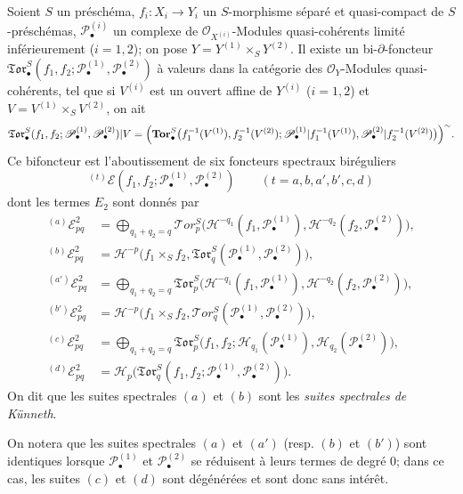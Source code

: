 \begin{theorem}[6.7.3]
Soient $S$ un préschéma, $f_i:X_i\to Y_i$ un $S$-morphisme séparé et
quasi-compact de $S$-préschémas, $\mathscr P_\bullet^{(i)}$ un complexe de
$\mathscr O_{X^{(i)}}$-Modules quasi-cohérents limité inférieurement
($i=1,2$); on pose $Y=Y^{(1)}\times_S Y^{(2)}$. Il existe un
bi-$\partial$-foncteur
  $\mathfrak{Tor}_\bullet^S
(f_1,f_2;\mathscr P_\bullet^{(1)},\mathscr P_\bullet^{(2)})$
à valeurs dans la catégorie des $\mathscr O_Y$-Modules quasi-cohérents, tel
que si $V^{(i)}$ est un ouvert affine de $Y^{(i)}$ ($i=1,2$) et
$V=V^{(1)}\times_S V^{(2)}$, on ait
\[
  \mathfrak{Tor}_\bullet^S
  (f_1,f_2;\mathscr P_\bullet^{(1)},\mathscr P_\bullet^{(2)})|V
  =\Bigl(\mathbf{Tor}_\bullet^S
    \bigl(f_1^{-1}(V^{(1)}),f_2^{-1}(V^{(2)});
      \mathscr P_\bullet^{(1)}|f_1^{-1}(V^{(1)}),
      \mathscr P_\bullet^{(2)}|f_2^{-1}(V^{(2)})\bigr)\Bigr)^{\sim}.
\]
Ce bifoncteur est l'aboutissement de six foncteurs spectraux biréguliers
\[
  {}^{(t)}\mathscr E
  (f_1,f_2;\mathscr P_\bullet^{(1)},\mathscr P_\bullet^{(2)})
  \qquad(t=a,b,a',b',c,d)
\]
dont les termes $E_2$ sont donnés par
\[
\begin{aligned}
  {}^{(a)}\mathscr E_{pq}^2
  &=\bigoplus_{q_1+q_2=q}
    \mathscr{T}\!or_p^S
    \bigl(\mathscr H^{-q_1}(f_1,\mathscr P_\bullet^{(1)}),
          \mathscr H^{-q_2}(f_2,\mathscr P_\bullet^{(2)})\bigr),\\
  {}^{(b)}\mathscr E_{pq}^2
  &=\mathscr H^{-p}\bigl(f_1\times_S f_2,
    \mathfrak{Tor}_q^S
    (\mathscr P_\bullet^{(1)},\mathscr P_\bullet^{(2)})\bigr),\\
  {}^{(a')}\mathscr E_{pq}^2
  &=\bigoplus_{q_1+q_2=q}
    \mathfrak{Tor}_p^S
    \bigl(\mathscr H^{-q_1}(f_1,\mathscr P_\bullet^{(1)}),
          \mathscr H^{-q_2}(f_2,\mathscr P_\bullet^{(2)})\bigr),\\
  {}^{(b')}\mathscr E_{pq}^2
  &=\mathscr H^{-p}\bigl(f_1\times_S f_2,
    \mathscr{T}\!or_q^S
    (\mathscr P_\bullet^{(1)},\mathscr P_\bullet^{(2)})\bigr),\\
  {}^{(c)}\mathscr E_{pq}^2
  &=\bigoplus_{q_1+q_2=q}
    \mathfrak{Tor}_p^S
    \bigl(f_1,f_2;
      \mathscr H_{q_1}(\mathscr P_\bullet^{(1)}),
      \mathscr H_{q_2}(\mathscr P_\bullet^{(2)})\bigr),\\
  {}^{(d)}\mathscr E_{pq}^2
  &=\mathscr H_p\bigl(\mathfrak{Tor}_q^S
    (f_1,f_2;\mathscr P_\bullet^{(1)},\mathscr P_\bullet^{(2)})\bigr).
\end{aligned}
\]
On dit que les suites spectrales $(a)$ et $(b)$ sont les \emph{suites
spectrales de Künneth}.

On notera que les suites spectrales $(a)$ et $(a')$ (resp. $(b)$ et $(b')$)
sont identiques lorsque $\mathscr P_\bullet^{(1)}$ et
$\mathscr P_\bullet^{(2)}$ se réduisent à leurs termes de degré 0; dans ce cas,
les suites $(c)$ et $(d)$ sont dégénérées et sont donc sans intérêt.
\end{theorem}

